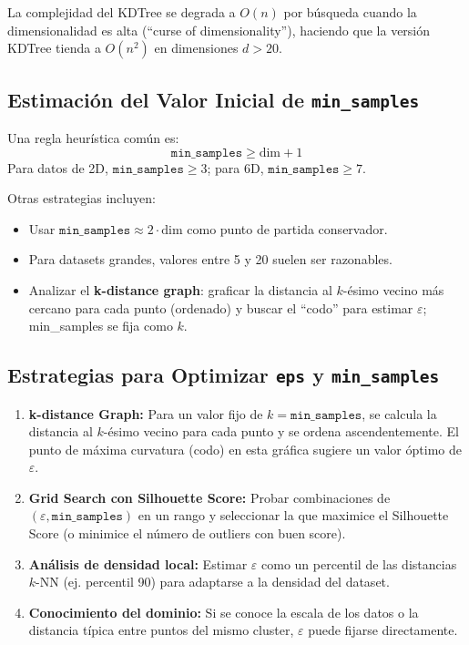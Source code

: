 \documentclass[12pt,a4paper]{article}
\begin{document}
La complejidad del KDTree se degrada a $O(n)$ por búsqueda cuando la dimensionalidad es alta (``curse of dimensionality''), haciendo que la versión KDTree tienda a $O(n^2)$ en dimensiones $d > 20$.

\subsection{Estimación del Valor Inicial de \texttt{min\_samples}}

Una regla heurística común es:
\[
\texttt{min\_samples} \geq \text{dim} + 1
\]
Para datos de 2D, $\texttt{min\_samples} \geq 3$; para 6D, $\texttt{min\_samples} \geq 7$.

Otras estrategias incluyen:
\begin{itemize}
    \item Usar $\texttt{min\_samples} \approx 2 \cdot \text{dim}$ como punto de partida conservador.
    \item Para datasets grandes, valores entre 5 y 20 suelen ser razonables.
    \item Analizar el \textbf{k-distance graph}: graficar la distancia al $k$-ésimo vecino más cercano para cada punto (ordenado) y buscar el ``codo'' para estimar $\varepsilon$; min\_samples se fija como $k$.
\end{itemize}

\subsection{Estrategias para Optimizar \texttt{eps} y \texttt{min\_samples}}

\begin{enumerate}[label=\alph*)]
    \item \textbf{k-distance Graph:} Para un valor fijo de $k = \texttt{min\_samples}$, se calcula la distancia al $k$-ésimo vecino para cada punto y se ordena ascendentemente. El punto de máxima curvatura (codo) en esta gráfica sugiere un valor óptimo de $\varepsilon$.
    
    \item \textbf{Grid Search con Silhouette Score:} Probar combinaciones de $(\varepsilon, \texttt{min\_samples})$ en un rango y seleccionar la que maximice el Silhouette Score (o minimice el número de outliers con buen score).
    
    \item \textbf{Análisis de densidad local:} Estimar $\varepsilon$ como un percentil de las distancias $k$-NN (ej. percentil 90) para adaptarse a la densidad del dataset.
    
    \item \textbf{Conocimiento del dominio:} Si se conoce la escala de los datos o la distancia típica entre puntos del mismo cluster, $\varepsilon$ puede fijarse directamente.
\end{enumerate}
\end{document}
